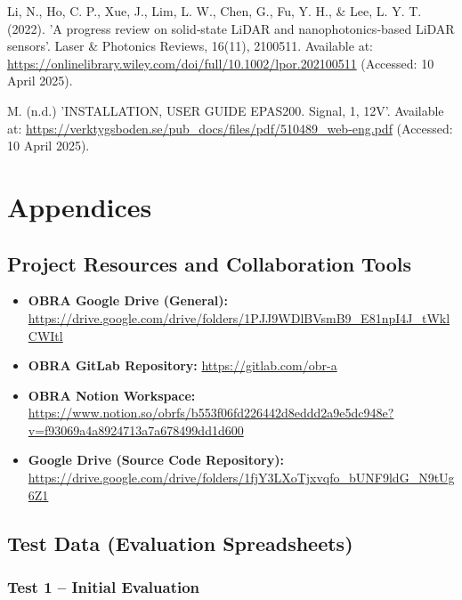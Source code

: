 \documentclass[a4paper,11pt]{report}
\begin{document}
\begin{thebibliography}{28}
     Li, N., Ho, C. P., Xue, J., Lim, L. W., Chen, G., Fu, Y. H., \& Lee, L. Y. T. (2022). 'A progress review on solid‐state LiDAR and nanophotonics‐based LiDAR sensors'. Laser \& Photonics Reviews, 16(11), 2100511. Available at: \url{https://onlinelibrary.wiley.com/doi/full/10.1002/lpor.202100511} (Accessed: 10 April 2025).

     M. (n.d.) 'INSTALLATION, USER GUIDE EPAS200. Signal, 1, 12V'. Available at: \url{https://verktygsboden.se/pub_docs/files/pdf/510489_web-eng.pdf} (Accessed: 10 April 2025).

\end{thebibliography}

\newpage

\chapter*{Appendices}

\section*{Project Resources and Collaboration Tools}

\begin{sloppypar}
\begin{itemize}
    \item \textbf{OBRA Google Drive (General):} \url{https://drive.google.com/drive/folders/1PJJ9WDlBVsmB9_E81npI4J_tWklCWItl}
    \item \textbf{OBRA GitLab Repository:} \url{https://gitlab.com/obr-a}
    \item \textbf{OBRA Notion Workspace:} \url{https://www.notion.so/obrfs/b553f06fd226442d8eddd2a9e5dc948e?v=f93069a4a8924713a7a678499dd1d600}
    \item \textbf{Google Drive (Source Code Repository):} \url{https://drive.google.com/drive/folders/1fjY3LXoTjxvqfo_bUNF9ldG_N9tUg6Z1}
\end{itemize}
\end{sloppypar}
\vspace{1cm}

\section*{Test Data (Evaluation Spreadsheets)}

\subsection*{Test 1 – Initial Evaluation}
\end{document}
